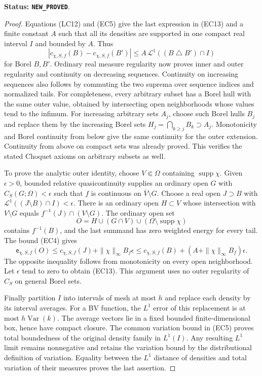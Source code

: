 \documentclass[11pt,a4paper]{article}
\numberwithin{equation}{section}
\theoremstyle{definition}
\theoremstyle{remark}
\begin{document}
\noindent\textbf{Status: \texttt{NEW\_PROVED}}.

\begin{proof}
Equations (LC12) and (EC5) give the last expression in (EC13)
and a finite constant $A$ such that all its densities are supported
in one compact real interval $I$ and bounded by $A$.  Thus
\[
 |c_{\chi,S,f}(B)-c_{\chi,S,f}(B')|
                 \le A\,\mathcal L^1((B\mathbin\triangle B')\cap I)
 \tag{EC14}
\]
for Borel $B,B'$.  Ordinary real measure regularity now proves
inner and outer regularity and continuity on decreasing sequences.
Continuity on increasing sequences also follows by commuting the
two suprema over sequence indices and normalized tails.
For completeness, every arbitrary subset has a Borel hull with
the same outer value, obtained by intersecting open neighborhoods
whose values tend to the infimum.  For increasing arbitrary sets
$A_j$, choose such Borel hulls $B_j$ and replace them by the
increasing Borel sets $H_j=\bigcap_{k\geq j}B_k\supset A_j$.
Monotonicity and Borel continuity from below give the same
continuity for the outer extension.  Continuity from above on
compact sets was already proved.  This verifies the stated
Choquet axioms on arbitrary subsets as well.

To prove the analytic outer identity, choose $V\Subset\Omega$
containing $\operatorname{supp}\chi$.  Given $\epsilon>0$,
bounded relative quasicontinuity supplies an ordinary open $G$
with $C_S(G;\Omega)<\epsilon$ such that $f$ is continuous on
$\overline V\setminus G$.  Choose a real open $J\supset B$
with $\mathcal L^1((J\setminus B)\cap I)<\epsilon$.
There is an ordinary open $H\subset V$ whose intersection
with $V\setminus G$ equals $f^{-1}(J)\cap(V\setminus G)$.
The ordinary open set
\[
 O=H\cup(G\cap V)\cup(\Omega\setminus\operatorname{supp}\chi)
\]
contains $f^{-1}(B)$, and the last summand has zero weighted
energy for every tail.  The bound (EC4) gives
\[
 \mathsf e_{\chi,S,f}(O)
 \le c_{\chi,S,f}(J)
          +\|\chi\|_\infty B_f\epsilon
 \le c_{\chi,S,f}(B)
          +(A+\|\chi\|_\infty B_f)\epsilon.
\]
The opposite inequality follows from monotonicity on every
open neighborhood.  Let $\epsilon$ tend to zero to obtain
(EC13).  This argument uses no outer regularity of $C_S$ on
general Borel sets.

Finally partition $I$ into intervals of mesh at most $h$ and
replace each density by its interval averages.  For a BV
function, the $L^1$ error of this replacement is at most
$h\operatorname{Var}(k)$.  The average vectors lie in a fixed
bounded finite-dimensional box, hence have compact closure.
The common variation bound in (EC5) proves total boundedness
of the original density family in $L^1(I)$.  Any resulting
$L^1$ limit remains nonnegative and retains the variation bound
by the distributional definition of variation.  Equality between
the $L^1$ distance of densities and total variation of their
measures proves the last assertion.
\end{proof}
\end{document}
